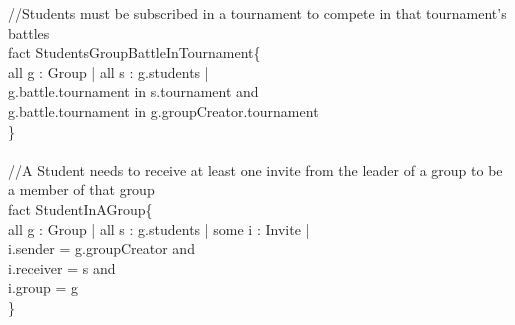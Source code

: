 \documentclass{article}
\begin{document}
{\newpage
\color{gray}
//Students must be subscribed in a tournament to compete in that tournament's battles\\
\color{black}
\color{blue} fact \color{black} StudentsGroupBattleInTournament\{\\
\-\hspace{1cm} \color{blue} all \color{black} g : Group | \color{blue} all \color{black} s : g.students | \\
\-\hspace{1cm} g.battle.tournament \color{blue} in \color{black} s.tournament and \\
\-\hspace{1cm} g.battle.tournament \color{blue} in \color{black} g.groupCreator.tournament\\
\}\\
\\
\color{gray}
//A Student needs to receive at least one invite from the leader of a group to be a member of that group\\
\color{black}
\color{blue} fact \color{black} StudentInAGroup\{\\
\-\hspace{1cm} \color{blue} all \color{black} g : Group | \color{blue} all \color{black} s : g.students | \color{blue} some \color{black} i : Invite |\\
\-\hspace{1cm} i.sender \color{blue} = \color{black} g.groupCreator and\\
\-\hspace{1cm} i.receiver \color{blue} = \color{black} s  and \\
\-\hspace{1cm} i.group \color{blue} = \color{black} g\\
\}\\


}
\end{document}

